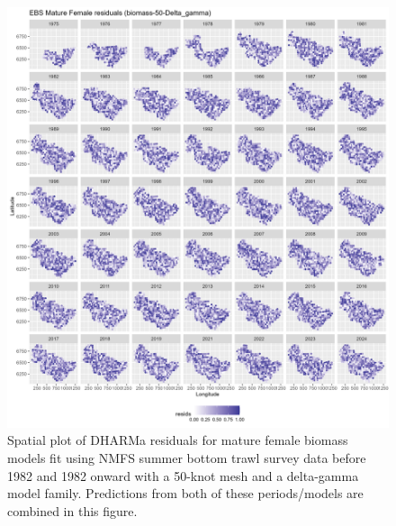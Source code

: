 \documentclass[
]{article}
\begin{document}
\begin{figure}

{\centering \includegraphics[width=1\linewidth,height=1\textheight]{../BAIRDI/Figures/DHARMa_Mature Female_biomass-50-Delta_gamma_SPATIAL} 

}

\caption{Spatial plot of DHARMa residuals for mature female biomass models fit using NMFS summer bottom trawl survey data before 1982 and 1982 onward with a 50-knot mesh and a delta-gamma model family. Predictions from both of these periods/models are combined in this figure.}\label{fig:DHARMa-bio-spat-50-matfem}
\end{figure}
\end{document}
